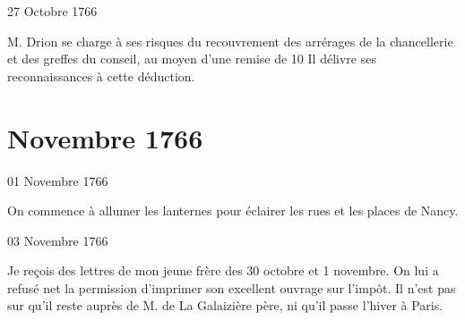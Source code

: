                      \begin{diary}{27 Octobre 1766}{}
                        
                        
                           M. Drion se charge à ses risques du
                           recouvrement des arrérages
                           de la chancellerie
                           et des greffes du conseil, au
                           moyen d’une
                           remise de 10%
                           Il délivre ses reconnaissances à cette déduction. \bigskip
        
        
                     \end{diary}
                  \chapter*{Novembre 1766}
                     
                     
                     
                     \begin{diary}{01 Novembre 1766}{}
                        
                         On commence à allumer les lanternes
                           pour
                           éclairer les rues et les places de Nancy.
                        \bigskip
        
        
                     \end{diary}

                     \begin{diary}{03 Novembre 1766}{}
                        
                         Je reçois des lettres de mon jeune frère des
                           30 octobre et 1
                              novembre. On lui a refusé net
                           la permission d’imprimer son excellent
                              ouvrage
                              sur l’impôt. Il n’est pas sur qu’il reste auprès
                           de M. de La Galaizière père, ni qu’il passe
                           l’hiver à Paris. \bigskip
        
        
                     \end{diary}

